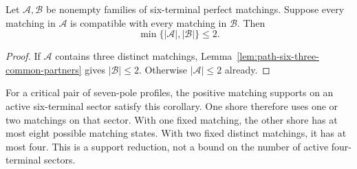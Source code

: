 \begin{corollary}
\label{cor:path-six-small-cross-support}
Let $\mathcal A,\mathcal B$ be nonempty families of six-terminal perfect matchings.
Suppose every matching in $\mathcal A$ is compatible with every matching in $\mathcal B$.
Then
\[
 \min\{|\mathcal A|,|\mathcal B|\}\le2.
\]
\end{corollary}

\begin{proof}
If $\mathcal A$ contains three distinct matchings, Lemma~\ref{lem:path-six-three-common-partners} gives $|\mathcal B|\le2$.
Otherwise $|\mathcal A|\le2$ already.
\end{proof}

For a critical pair of seven-pole profiles, the positive matching supports on an active six-terminal sector satisfy this corollary.
One shore therefore uses one or two matchings on that sector.
With one fixed matching, the other shore has at most eight possible matching states.
With two fixed distinct matchings, it has at most four.
This is a support reduction, not a bound on the number of active four-terminal sectors.
